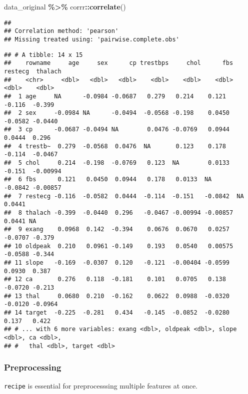 \documentclass[
]{book}
\newenvironment{Shaded}{\begin{snugshade}}{\end{snugshade}}
\newcommand{\KeywordTok}[1]{\textcolor[rgb]{0.13,0.29,0.53}{\textbf{#1}}}
\newcommand{\NormalTok}[1]{#1}
\newcommand{\OperatorTok}[1]{\textcolor[rgb]{0.81,0.36,0.00}{\textbf{#1}}}
\newcommand{\StringTok}[1]{\textcolor[rgb]{0.31,0.60,0.02}{#1}}
\begin{document}
\begin{Shaded}
\begin{Highlighting}[]
\NormalTok{data\_original }\OperatorTok{\%\textgreater{}\%}
\StringTok{  }\NormalTok{corrr}\OperatorTok{::}\KeywordTok{correlate}\NormalTok{()}
\end{Highlighting}
\end{Shaded}

\begin{verbatim}
## 
## Correlation method: 'pearson'
## Missing treated using: 'pairwise.complete.obs'
\end{verbatim}

\begin{verbatim}
## # A tibble: 14 x 15
##    rowname     age     sex      cp trestbps     chol      fbs restecg  thalach
##    <chr>     <dbl>   <dbl>   <dbl>    <dbl>    <dbl>    <dbl>   <dbl>    <dbl>
##  1 age     NA      -0.0984 -0.0687   0.279   0.214    0.121   -0.116  -0.399  
##  2 sex     -0.0984 NA      -0.0494  -0.0568 -0.198    0.0450  -0.0582 -0.0440 
##  3 cp      -0.0687 -0.0494 NA        0.0476 -0.0769   0.0944   0.0444  0.296  
##  4 trestb~  0.279  -0.0568  0.0476  NA       0.123    0.178   -0.114  -0.0467 
##  5 chol     0.214  -0.198  -0.0769   0.123  NA        0.0133  -0.151  -0.00994
##  6 fbs      0.121   0.0450  0.0944   0.178   0.0133  NA       -0.0842 -0.00857
##  7 restecg -0.116  -0.0582  0.0444  -0.114  -0.151   -0.0842  NA       0.0441 
##  8 thalach -0.399  -0.0440  0.296   -0.0467 -0.00994 -0.00857  0.0441 NA      
##  9 exang    0.0968  0.142  -0.394    0.0676  0.0670   0.0257  -0.0707 -0.379  
## 10 oldpeak  0.210   0.0961 -0.149    0.193   0.0540   0.00575 -0.0588 -0.344  
## 11 slope   -0.169  -0.0307  0.120   -0.121  -0.00404 -0.0599   0.0930  0.387  
## 12 ca       0.276   0.118  -0.181    0.101   0.0705   0.138   -0.0720 -0.213  
## 13 thal     0.0680  0.210  -0.162    0.0622  0.0988  -0.0320  -0.0120 -0.0964 
## 14 target  -0.225  -0.281   0.434   -0.145  -0.0852  -0.0280   0.137   0.422  
## # ... with 6 more variables: exang <dbl>, oldpeak <dbl>, slope <dbl>, ca <dbl>,
## #   thal <dbl>, target <dbl>
\end{verbatim}

\hypertarget{preprocessing}{%
\subsubsection{Preprocessing}\label{preprocessing}}

\texttt{recipe} is essential for preprocesssing multiple features at once.
\end{document}
